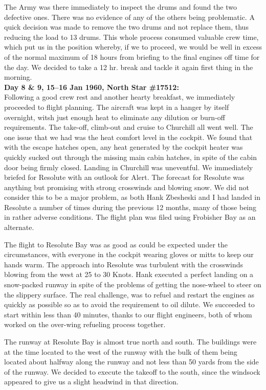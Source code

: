 The Army was there immediately to inspect the drums and found the two
defective ones. There was no evidence of any of the others being
problematic. A quick decision was made to remove the two drums and not
replace them, thus reducing the load to 13 drums. This whole process
consumed valuable crew time, which put us in the position whereby, if
we to proceed, we would be well in excess of the normal maximum of 18
hours from briefing to the final engines off time for the day. We
decided to take a 12 hr. break and tackle it again first thing in the
morning.\\

\noindent\textbf{Day 8 \& 9, 15--16 Jan 1960, North Star \#17512:}\\

Following a good crew rest and another hearty breakfast, we immediately
proceeded to flight planning. The aircraft was kept in a hanger by
itself overnight, witsh just enough heat to eliminate any dilution or
burn-off requirements. The take-off, climb-out and cruise to Churchill
all went well. The one issue that we had was the heat comfort level in
the cockpit. We found that with the escape hatches open, any heat
generated by the cockpit heater was quickly sucked out through the
missing main cabin hatches, in spite of the cabin door being firmly
closed. Landing in Churchill was uneventful. We immediately briefed for
Resolute with an outlook for Alert. The forecast for Resolute was
anything but promising with strong crosswinds and blowing snow. We did
not consider this to be a major problem, as both Hank Zbesheski and I
had landed in Resolute a number of times during the previous 12 months,
many of those being in rather adverse conditions. The flight plan was
filed using Frobisher Bay as an alternate.

The flight to Resolute Bay was as good as could be expected under the
circumstances, with everyone in the cockpit wearing gloves or mitts to
keep our hands warm. The approach into Resolute was turbulent with the
crosswinds blowing from the west at 25 to 30 Knots. Hank executed a
perfect landing on a snow-packed runway in spite of the problems of
getting the nose-wheel to steer on the slippery surface. The real
challenge, was to refuel and restart the engines as quickly as possible
so as to avoid the requirement to oil dilute. We succeeded to start
within less than 40 minutes, thanks to our flight engineers, both of
whom worked on the over-wing refueling process together.

The runway at Resolute Bay is almost true north and south. The
buildings were at the time located to the west of the runway with the
bulk of them being located about halfway along the runway and not less
than 50 yards from the side of the runway. We decided to execute the
takeoff to the south, since the windsock appeared to give us a slight
headwind in that direction.

